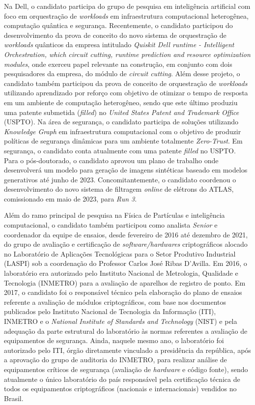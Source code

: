 Na Dell, o candidato participa do grupo de pesquisa em inteligência artificial com foco em orquestração 
de \emph{workloads} em infraestrutura computacional heterogênea, computação quântica e segurança. 
Recentemente, o candidato participou do desenvolvimento da prova de conceito do novo sistema de 
orquestração de \emph{workloads} quânticos da empresa intitulado \emph{Quiskit Dell runtime - Intelligent 
Orchestration, which circuit cutting, runtime prediction and resource optimization modules}, onde 
exerceu papel relevante na construção, em conjunto com dois pesquisadores da empresa, do módulo de 
\emph{circuit cutting}. Além desse projeto, o candidato também participou da prova de conceito de orquestração 
de \emph{workloads} utilizando aprendizado por reforço com objetivo de otimizar o tempo de resposta em um 
ambiente de computação heterogêneo, sendo que este último produziu uma patente submetida (\emph{filled}) no 
\emph{United States Patent and Trademark Office} (USPTO). Na área de segurança, o candidato participa de soluções 
utilizando \emph{Knowledge Graph} em infraestrutura computacional com o objetivo de produzir políticas de segurança 
dinâmicas para um ambiente totalmente \emph{Zero-Trust}. Em segurança, o candidato conta atualmente com uma patente 
\emph{filled} no USPTO. Para o pós-doutorado, o candidato aprovou um plano de trabalho onde desenvolverá um modelo 
para geração de imagens sintéticas baseado em modelos generativos até junho de 2023. Concomitantemente, o 
candidato coordenou o desenvolvimento do novo sistema de filtragem \emph{online} de elétrons do ATLAS, comissionado em maio de 2023, 
para \emph{Run 3}.



Além do ramo principal de pesquisa na Física de Partículas e inteligência computacional, o candidato 
também participou como analista \emph{Senior} e coordenador da equipe de ensaios, desde fevereiro de 
2016 até dezembro de 2021, do grupo de avaliação e certificação 
de \emph{software/hardwares} criptográficos alocado no Laboratório de Aplicações Tecnológicas para 
o Setor Produtivo Industrial (LASPI) sob a coordenação do Professor Carlos José Ribas D'Avilla.
Em 2016, o laboratório era autorizado pelo Instituto Nacional de Metrologia, Qualidade e Tecnologia (INMETRO) 
para a avaliação de aparelhos de registro de ponto. 
Em 2017, o candidato foi o responsável técnico pela elaboração do plano de ensaios referente a avaliação 
de módulos criptográficos, com base nos documentos publicados pelo Instituto Nacional de Tecnologia 
da Informação (ITI), INMETRO e o \emph{National Institute of Standards and Technology} (NIST) e pela adequação 
da parte estrutural do laboratório às normas referentes a avaliação de equipamentos de segurança. 
Ainda, naquele mesmo ano, o laboratório foi autorizado pelo ITI, órgão diretamente vinculado a presidência 
da república, após a aprovação do grupo de auditoria do INMETRO, para realizar análise de equipamentos críticos 
de segurança (avaliação de \emph{hardware} e código fonte), sendo atualmente o único laboratório do país 
responsável pela certificação técnica de todos os equipamentos criptográficos (nacionais e internacionais) 
vendidos no Brasil. 


